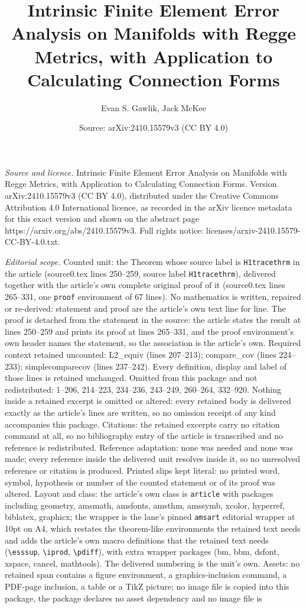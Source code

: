 \documentclass[10pt,a4paper]{amsart}
\title[Intrinsic Finite Element Error Analysis on Manifolds with Re]{Intrinsic Finite Element Error Analysis on Manifolds with Regge Metrics, with Application to Calculating Connection Forms}
\author{Evan S. Gawlik, Jack McKee}
\date{Source: arXiv:2410.15579v3 (CC BY 4.0)}
\begin{document}
\maketitle

\noindent\emph{Source and licence.} Intrinsic Finite Element Error Analysis on Manifolds with Regge Metrics, with Application to Calculating Connection Forms. Version arXiv:2410.15579v3 (CC BY 4.0), distributed under the Creative Commons Attribution 4.0 International licence, as recorded in the arXiv licence metadata for this exact version and shown on the abstract page https://arxiv.org/abs/2410.15579v3. Full rights notice: licenses/arxiv-2410.15579-CC-BY-4.0.txt.\par\smallskip

\noindent\textit{Editorial scope.} Counted unit: the Theorem whose source label is \texttt{H1tracethrm} in the article (source0.tex lines 250--259, source label \texttt{H1tracethrm}), delivered together with the article's own complete original proof of it (source0.tex lines 265--331, one \texttt{proof} environment of 67 lines). No mathematics is written, repaired or re-derived: statement and proof are the article's own text line for line. The proof is detached from the statement in the source: the article states the result at lines 250--259 and prints its proof at lines 265--331, and the proof environment's own header names the statement, so the association is the article's own. Required context retained uncounted: L2\_equiv (lines 207--213); compare\_cov (lines 224--233); simplecomparecov (lines 237--242). Every definition, display and label of those lines is retained unchanged. Omitted from this package and not redistributed: 1--206, 214--223, 234--236, 243--249, 260--264, 332--920. Nothing inside a retained excerpt is omitted or altered: every retained body is delivered exactly as the article's lines are written, so no omission receipt of any kind accompanies this package. Citations: the retained excerpts carry no citation command at all, so no bibliography entry of the article is transcribed and no reference is redistributed. Reference adaptation: none was needed and none was made; every reference inside the delivered unit resolves inside it, so no unresolved reference or citation is produced. Printed slips kept literal: no printed word, symbol, hypothesis or number of the counted statement or of its proof was altered. Layout and class: the article's own class is \texttt{article} with packages including geometry, amsmath, amsfonts, amsthm, amssymb, xcolor, hyperref, biblatex, graphicx; the wrapper is the lane's pinned \texttt{amsart} editorial wrapper at 10pt on A4, which restates the theorem-like environments the retained text needs and adds the article's own macro definitions that the retained text needs (\texttt{\textbackslash esssup}, \texttt{\textbackslash iprod}, \texttt{\textbackslash pdiff}), with extra wrapper packages (bm, bbm, dsfont, xspace, cancel, mathtools). The delivered numbering is the unit's own. Assets: no retained span contains a figure environment, a graphics-inclusion command, a PDF-page inclusion, a table or a TikZ picture; no image file is copied into this package, the package declares no asset dependency and no image file is 
\end{document}

